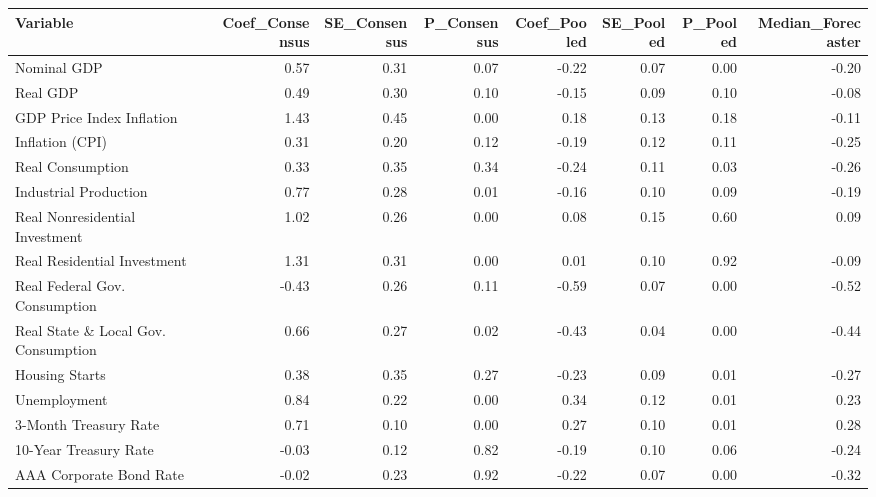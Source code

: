 
\begin{tabular}{lrrrrrrr}
\toprule
Variable & Coef\_Consensus & SE\_Consensus & P\_Consensus & Coef\_Pooled & SE\_Pooled & P\_Pooled & Median\_Forecaster\\
\midrule
Nominal GDP & 0.57 & 0.31 & 0.07 & -0.22 & 0.07 & 0.00 & -0.20\\
Real GDP & 0.49 & 0.30 & 0.10 & -0.15 & 0.09 & 0.10 & -0.08\\
GDP Price Index Inflation & 1.43 & 0.45 & 0.00 & 0.18 & 0.13 & 0.18 & -0.11\\
Inflation (CPI) & 0.31 & 0.20 & 0.12 & -0.19 & 0.12 & 0.11 & -0.25\\
Real Consumption & 0.33 & 0.35 & 0.34 & -0.24 & 0.11 & 0.03 & -0.26\\
\addlinespace
Industrial Production & 0.77 & 0.28 & 0.01 & -0.16 & 0.10 & 0.09 & -0.19\\
Real Nonresidential Investment & 1.02 & 0.26 & 0.00 & 0.08 & 0.15 & 0.60 & 0.09\\
Real Residential Investment & 1.31 & 0.31 & 0.00 & 0.01 & 0.10 & 0.92 & -0.09\\
Real Federal Gov. Consumption & -0.43 & 0.26 & 0.11 & -0.59 & 0.07 & 0.00 & -0.52\\
Real State \& Local Gov. Consumption & 0.66 & 0.27 & 0.02 & -0.43 & 0.04 & 0.00 & -0.44\\
\addlinespace
Housing Starts & 0.38 & 0.35 & 0.27 & -0.23 & 0.09 & 0.01 & -0.27\\
Unemployment & 0.84 & 0.22 & 0.00 & 0.34 & 0.12 & 0.01 & 0.23\\
3-Month Treasury Rate & 0.71 & 0.10 & 0.00 & 0.27 & 0.10 & 0.01 & 0.28\\
10-Year Treasury Rate & -0.03 & 0.12 & 0.82 & -0.19 & 0.10 & 0.06 & -0.24\\
AAA Corporate Bond Rate & -0.02 & 0.23 & 0.92 & -0.22 & 0.07 & 0.00 & -0.32\\
\bottomrule
\end{tabular}
